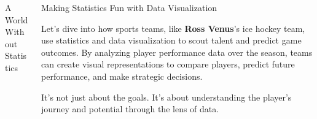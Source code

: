 \documentclass[final]{beamer}
\begin{document}
\begin{frame}[t]{}
\begin{columns}[t]
\begin{column}{.33\textwidth}
\begin{block}{A World Without Statistics}
				\vspace{0.5cm}
				
			\end{block}
			
		\end{column}

		\begin{column}{.3\textwidth}

			\begin{block}{Making Statistics Fun with Data Visualization}

				\vspace{0.5cm}

				Let's dive into how sports teams, like \textbf{Ross Venus}'s ice hockey team, use statistics and data visualization to scout talent and predict game outcomes. By analyzing player performance data over the season, teams can create visual representations to compare players, predict future performance, and make strategic decisions.

				\vspace{0.5cm}

				It's not just about the goals. It's about understanding the player's journey and potential through the lens of data.

				\vspace{1cm}

				\begin{figure}[htbp]
					
					\centering
					

\end{figure}
\end{block}
\end{column}
\end{columns}
\end{frame}
\end{document}
